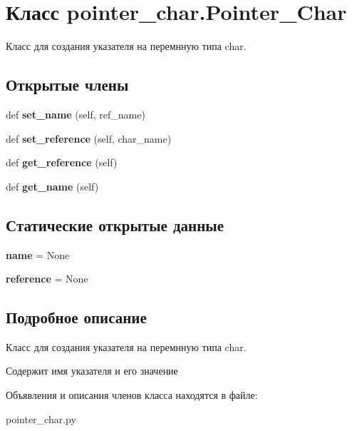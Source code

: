 \hypertarget{classpointer__char_1_1_pointer___char}{}\section{Класс pointer\+\_\+char.\+Pointer\+\_\+\+Char}
\label{classpointer__char_1_1_pointer___char}


Класс для создания указателя на перемнную типа char.  


\subsection*{Открытые члены}
\begin{DoxyCompactItemize}
\item 
\mbox{\label{classpointer__char_1_1_pointer___char_ac2bf126e1792848e9d557fd717328361}} 
def {\bfseries set\+\_\+name} (self, ref\+\_\+name)
\item 
\mbox{\label{classpointer__char_1_1_pointer___char_a3b498ef2b5ba055eb348222ee056892c}} 
def {\bfseries set\+\_\+reference} (self, char\+\_\+name)
\item 
\mbox{\label{classpointer__char_1_1_pointer___char_ae8555b5a66cebf654bc6bcac9231a5cd}} 
def {\bfseries get\+\_\+reference} (self)
\item 
\mbox{\label{classpointer__char_1_1_pointer___char_aa4ea43b72dd8174d0aa8036840d43060}} 
def {\bfseries get\+\_\+name} (self)
\end{DoxyCompactItemize}
\subsection*{Статические открытые данные}
\begin{DoxyCompactItemize}
\item 
\mbox{\label{classpointer__char_1_1_pointer___char_acdd9dc31491fdec667c7f9cafc7c3606}} 
{\bfseries name} = None
\item 
\mbox{\label{classpointer__char_1_1_pointer___char_ab200fe1b1a8a99f7cbb96dc674c5b38b}} 
{\bfseries reference} = None
\end{DoxyCompactItemize}


\subsection{Подробное описание}
Класс для создания указателя на перемнную типа char. 

Содержит имя указателя и его значение 

Объявления и описания членов класса находятся в файле\+:\begin{DoxyCompactItemize}
\item 
pointer\+\_\+char.\+py\end{DoxyCompactItemize}
